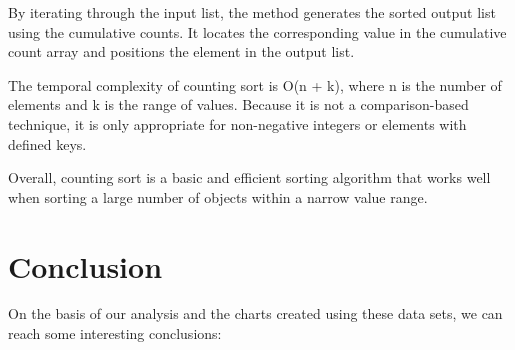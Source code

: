 \documentclass{article}
\begin{document}
By iterating through the input list, the method generates the sorted output list using the cumulative counts. It locates the corresponding value in the cumulative count array and positions the element in the output list.

The temporal complexity of counting sort is O(n + k), where n is the number of elements and k is the range of values. Because it is not a comparison-based technique, it is only appropriate for non-negative integers or elements with defined keys.

Overall, counting sort is a basic and efficient sorting algorithm that works well when sorting a large number of objects within a narrow value range.

\section{Conclusion }
On the basis of our analysis and the charts created using these data sets, we can reach some interesting conclusions:
\end{document}
